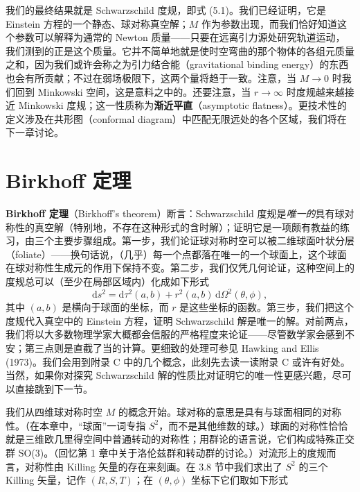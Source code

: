 我们的最终结果就是 Schwarzschild 度规，即式 (5.1)。我们已经证明，它是 Einstein 方程的一个静态、球对称真空解；$M$ 作为参数出现，而我们恰好知道这个参数可以解释为通常的 Newton 质量——只要在远离引力源处研究轨道运动，我们测到的正是这个质量。它并不简单地就是使时空弯曲的那个物体的各组元质量之和，因为我们或许会称之为引力结合能（gravitational binding energy）的东西也会有所贡献；不过在弱场极限下，这两个量将趋于一致。注意，当 $M \to 0$ 时我们回到 Minkowski 空间，这是意料之中的。还要注意，当 $r \to \infty$ 时度规越来越接近 Minkowski 度规；这一性质称为\textbf{渐近平直}（asymptotic flatness）。更技术性的定义涉及在共形图（conformal diagram）中匹配无限远处的各个区域，我们将在下一章讨论。

\section{Birkhoff 定理}

\textbf{Birkhoff 定理}（Birkhoff's theorem）断言：Schwarzschild 度规是\emph{唯一的}具有球对称性的真空解（特别地，不存在这种形式的含时解）；证明它是一项颇有教益的练习，由三个主要步骤组成。第一步，我们论证球对称时空可以被二维球面叶状分层（foliate）——换句话说，（几乎）每一个点都落在唯一的一个球面上，这个球面在球对称性生成元的作用下保持不变。第二步，我们仅凭几何论证，这种空间上的度规总可以（至少在局部区域内）化成如下形式
\begin{equation*}
\mathrm{d}s^2 = \mathrm{d}\tau^2(a, b) + r^2(a, b)\,\mathrm{d}\Omega^2(\theta, \phi),
\tag{5.24}
\end{equation*}
其中 $(a, b)$ 是横向于球面的坐标，而 $r$ 是这些坐标的函数。第三步，我们把这个度规代入真空中的 Einstein 方程，证明 Schwarzschild 解是唯一的解。对前两点，我们将以大多数物理学家大概都会信服的严格程度来论证——尽管数学家会感到不安；第三点则是直截了当的计算。更细致的处理可参见 Hawking and Ellis (1973)。我们会用到附录 C 中的几个概念，此刻先去读一读附录 C 或许有好处。当然，如果你对探究 Schwarzschild 解的性质比对证明它的唯一性更感兴趣，尽可以直接跳到下一节。

我们从四维球对称时空 $M$ 的概念开始。球对称的意思是具有与球面相同的对称性。（在本章中，“球面”一词专指 $S^2$，而不是其他维数的球。）球面的对称性恰恰就是三维欧几里得空间中普通转动的对称性；用群论的语言说，它们构成特殊正交群 SO(3)。（回忆第 1 章中关于洛伦兹群和转动群的讨论。）对流形上的度规而言，对称性由 Killing 矢量的存在来刻画。在 3.8 节中我们求出了 $S^2$ 的三个 Killing 矢量，记作 $(R, S, T)$；在 $(\theta, \phi)$ 坐标下它们取如下形式

